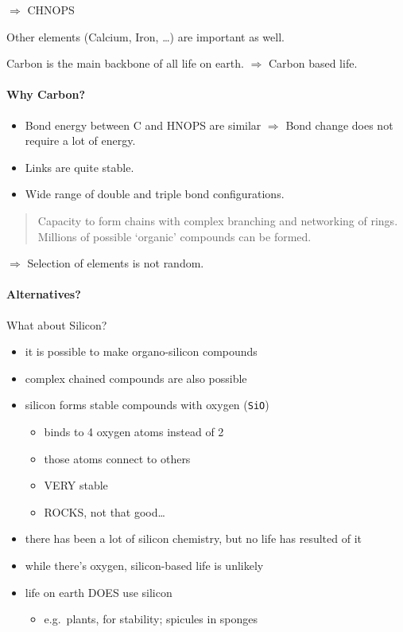 \(\Rightarrow\) CHNOPS

Other elements (Calcium, Iron, \ldots) are important as well.

Carbon is the main backbone of all life on earth. \(\Rightarrow\) Carbon
based life.

\hypertarget{why-carbon}{%
\paragraph{Why Carbon?}\label{why-carbon}}

\begin{itemize}
\tightlist
\item
  Bond energy between C and HNOPS are similar \(\Rightarrow\) Bond
  change does not require a lot of energy.
\item
  Links are quite stable.
\item
  Wide range of double and triple bond configurations.
\end{itemize}

\begin{quote}
Capacity to form chains with complex branching and networking of rings.
Millions of possible `organic' compounds can be formed.
\end{quote}

\(\Rightarrow\) Selection of elements is not random.

\hypertarget{alternatives}{%
\paragraph{Alternatives?}\label{alternatives}}

What about Silicon?

\begin{itemize}
\tightlist
\item
  it is possible to make organo-silicon compounds
\item
  complex chained compounds are also possible
\item
  silicon forms stable compounds with oxygen (\texttt{SiO})

  \begin{itemize}
  \tightlist
  \item
    binds to 4 oxygen atoms instead of 2
  \item
    those atoms connect to others
  \item
    VERY stable
  \item
    ROCKS, not that good\ldots{}
  \end{itemize}
\item
  there has been a lot of silicon chemistry, but no life has resulted of
  it
\item
  while there's oxygen, silicon-based life is unlikely
\item
  life on earth DOES use silicon

  \begin{itemize}
  \tightlist
  \item
    e.g.~plants, for stability; spicules in sponges
  \end{itemize}
\end{itemize}

